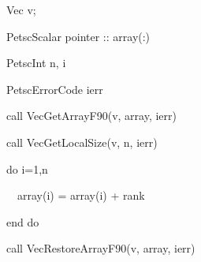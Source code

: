 \begin{frame}
{\begin{semiverbatim}
      Vec v;

      PetscScalar pointer :: array(:)

      PetscInt n, i

      PetscErrorCode ierr


      call VecGetArrayF90(v, array, ierr)

      call VecGetLocalSize(v, n, ierr)

      do i=1,n

      \ \ array(i) =  array(i) + rank

      end do

      call VecRestoreArrayF90(v, array, ierr)
\end{semiverbatim}
}

\end{frame}
